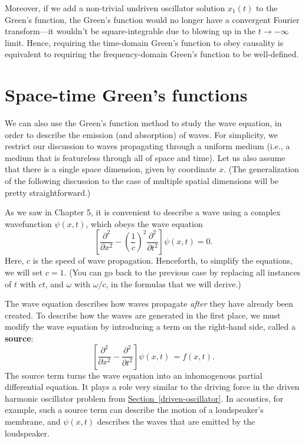 \documentclass[10pt,a4paper]{article}
\begin{document}
Moreover, if we add a non-trivial undriven oscillator solution
$x_1(t)$ to the Green's function, the Green's function would no longer
have a convergent Fourier transform---it wouldn't be square-integrable
due to blowing up in the $t \rightarrow -\infty$ limit. Hence,
requiring the time-domain Green's function to obey causality is
equivalent to requiring the frequency-domain Green's function to be
well-defined.

\section{Space-time Green's functions}
\label{space-time-greens-functions}

We can also use the Green's function method to study the wave
equation, in order to describe the emission (and absorption) of
waves. For simplicity, we restrict our discussion to waves propagating
through a uniform medium (i.e., a medium that is featureless through
all of space and time). Let us also assume that there is a single
space dimension, given by coordinate $x$. (The generalization of the
following discussion to the case of multiple spatial dimensions will
be pretty straightforward.)

As we saw in Chapter 5, it is convenient to describe a wave using a
complex wavefunction $\psi(x,t)$, which obeys the wave equation
\begin{equation}
  \left[\frac{\partial^2}{\partial x^2} - \left(\frac{1}{c}\right)^2 \frac{\partial^2}{\partial t^2} \right] \psi(x,t) = 0.
\end{equation}
Here, $c$ is the speed of wave propagation. Henceforth, to simplify
the equations, we will set $c = 1$. (You can go back to the previous
case by replacing all instances of $t$ with $c t$, and $\omega$ with
$\omega/c$, in the formulas that we will derive.)

The wave equation describes how waves propagate \emph{after} they have
already been created. To describe how the waves are generated in the
first place, we must modify the wave equation by introducing a term on
the right-hand side, called a \textbf{source}:
\begin{equation}
  \left[\frac{\partial^2}{\partial x^2} - \frac{\partial^2}{\partial t^2} \right] \psi(x,t)\, = f(x,t).
\end{equation}
The source term turns the wave equation into an inhomogenous partial
differential equation. It plays a role very similar to the driving
force in the driven harmonic oscillator problem from
\hyperref[driven-oscillator]{Section~\ref{driven-oscillator}}.  In
acoustics, for example, such a source term can describe the motion of
a loudspeaker's membrane, and $\psi(x,t)$ describes the waves that are
emitted by the loudspeaker.
\end{document}
